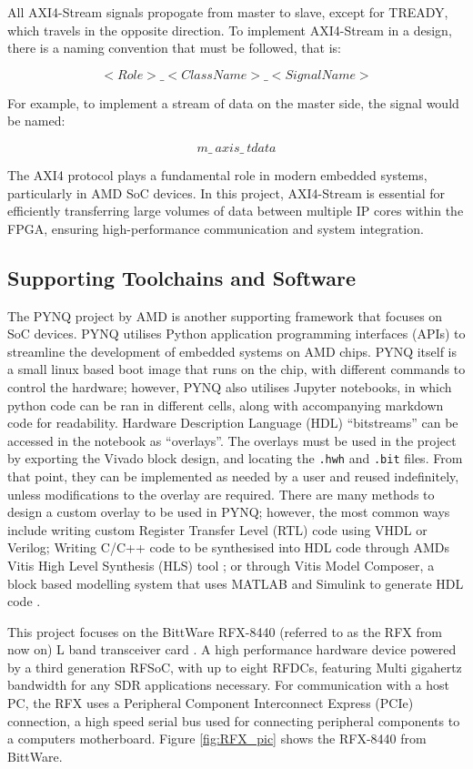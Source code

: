 \documentclass[12pt, a4paper]{article}
\begin{document}
All AXI4-Stream signals propogate from master to slave, except for TREADY, which travels in the opposite direction. To implement AXI4-Stream in a design, there is a naming convention that must be followed, that is:

\[<Role>\_<ClassName>\_<SignalName>\]

For example, to implement a stream of data on the master side, the signal would be named:

\[m\_\ axis\_\ tdata\]

The AXI4 protocol plays a fundamental role in modern embedded systems, particularly in AMD SoC devices. In this project, AXI4-Stream is essential for efficiently transferring large volumes of data between multiple IP cores within the FPGA, ensuring high-performance communication and system integration.

\subsection{Supporting Toolchains and Software}

The PYNQ project by AMD \cite{PYNQ} is another supporting framework that focuses on SoC devices. PYNQ utilises Python application programming interfaces (APIs) to streamline the development of embedded systems on AMD chips. PYNQ itself is a small linux based boot image that runs on the chip, with different commands to control the hardware; however, PYNQ also utilises Jupyter notebooks, in which python code can be ran in different cells, along with accompanying markdown code for readability. Hardware Description Language (HDL) \enquote{bitstreams} can be accessed in the notebook as \enquote{overlays}. The overlays must be used in the project by exporting the Vivado block design, and locating the \texttt{.hwh} and \texttt{.bit} files. From that point, they can be implemented as needed by a user and reused indefinitely, unless modifications to the overlay are required. There are many methods to design a custom overlay to be used in PYNQ; however, the most common ways include writing custom Register Transfer Level (RTL) code using VHDL or Verilog; Writing C/C++ code to be synthesised into HDL code through AMDs Vitis High Level Synthesis (HLS) tool \cite{AMD_Vitis_HLS_2024}; or through Vitis Model Composer, a block based modelling system that uses MATLAB and Simulink to generate HDL code \cite{AMD_Vitis_Model_Composer_2024}.


This project focuses on the BittWare RFX-8440 (referred to as the RFX from now on) L band transceiver card \cite{bittware2024rfx}. A high performance hardware device powered by a third generation RFSoC, with up to eight RFDCs, featuring Multi gigahertz bandwidth for any SDR applications necessary. For communication with a host PC, the RFX uses a Peripheral Component Interconnect Express (PCIe) connection, a high speed serial bus used for connecting peripheral components to a computers motherboard. Figure \ref{fig:RFX_pic} shows the RFX-8440 from BittWare.
\end{document}
